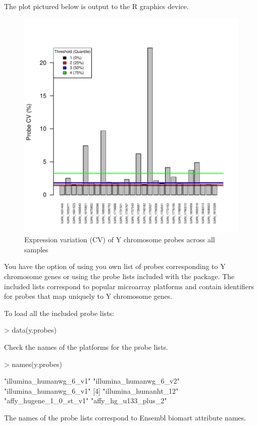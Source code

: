 \documentclass{article}
\begin{document}
The plot pictured below is output to the R graphics device.

\begin{figure}
\begin{center}
\includegraphics{massiR_vignette-fig1}
\end{center}
\caption{Expression variation (CV) of Y chromosome probes across all samples}
\label{fig:fig1}
\end{figure}

\clearpage

You have the option of using you own list of probes corresponding to Y chromosome genes or using the probe lists included with the package. The included lists correspond to popular microarray platforms and contain identifiers for probes that map uniquely to Y chromosome genes.

To load all the included probe lists:
\begin{Schunk}
\begin{Sinput}
>  data(y.probes)
\end{Sinput}
\end{Schunk}
Check the names of the platforms for the probe lists.
\begin{Schunk}
\begin{Sinput}
>   names(y.probes)
\end{Sinput}
\begin{Soutput}
[1] "illumina_humanwg_6_v1" "illumina_humanwg_6_v2" "illumina_humanwg_6_v1"
[4] "illumina_humanht_12"   "affy_hugene_1_0_st_v1" "affy_hg_u133_plus_2"  
\end{Soutput}
\end{Schunk}
The names of the probe lists correspond to Ensembl biomart attribute names.
\end{document}
